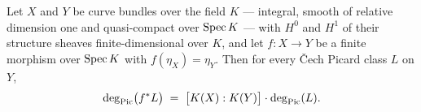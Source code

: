 \begin{theorem}
  \label{pa-thm:classDeg_cechPicMap_eq_finrank_mul}
  \leanok

  Let \(X\) and \(Y\) be curve bundles over the field \(K\) --- integral, smooth of
  relative dimension one and quasi-compact over \(\operatorname{Spec} K\) --- with \(H^0\) and
  \(H^1\) of their structure sheaves finite-dimensional over \(K\), and let
  \(f : X \to Y\) be a finite morphism over \(\operatorname{Spec} K\) with \(f(\eta_X) = \eta_Y\).
  Then for every \v Cech Picard class \(L\) on \(Y\),
  \[
    \deg_{\operatorname{Pic}}\bigl(f^{*}L\bigr)
      \;=\; \bigl[K(X) : K(Y)\bigr] \cdot \deg_{\operatorname{Pic}}(L).
  \]
\end{theorem}
